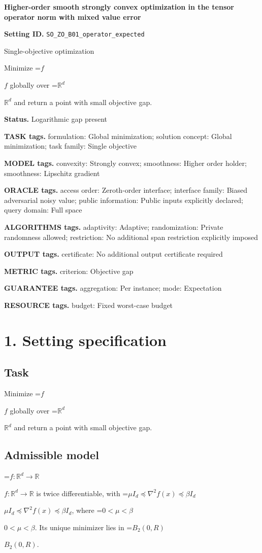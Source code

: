 \documentclass[10pt,a4paper]{article}
\newcommand{\AtlasMath}[1]{\par\begingroup\centering\setbox0=\hbox{$\displaystyle #1$}\ifdim\wd0>1.4\linewidth\typeout{ATLAS WIDE FORMULA: \the\wd0}\fi\ifdim\wd0>\linewidth\resizebox{\linewidth}{!}{\box0}\else\box0\fi\par\endgroup}
\newcommand{\AtlasInlineMath}[1]{\begingroup\setbox0=\hbox{$#1$}\ifdim\wd0>.4\linewidth\endgroup\AtlasMath{#1}\else\endgroup$#1$\fi}
\begin{document}
\raggedright

{\LARGE\bfseries\sffamily\color{AtlasNavy} Higher-order smooth strongly convex optimization in the tensor operator norm with mixed value error\par}\vspace{5pt}
\textbf{Setting ID.} \texttt{SO\_\allowbreak{}ZO\_\allowbreak{}B01\_\allowbreak{}operator\_\allowbreak{}expected}

Single-objective optimization

Minimize \AtlasInlineMath{f} globally over \AtlasInlineMath{\mathbb{R}^d} and return a point with small objective gap.

\textbf{Status.} Logarithmic gap present

\textbf{TASK tags.} formulation: Global minimization; solution concept: Global minimization; task family: Single objective

\textbf{MODEL tags.} convexity: Strongly convex; smoothness: Higher order holder; smoothness: Lipschitz gradient

\textbf{ORACLE tags.} access order: Zeroth-order interface; interface family: Biased adversarial noisy value; public information: Public inputs explicitly declared; query domain: Full space

\textbf{ALGORITHMS tags.} adaptivity: Adaptive; randomization: Private randomness allowed; restriction: No additional span restriction explicitly imposed

\textbf{OUTPUT tags.} certificate: No additional output certificate required

\textbf{METRIC tags.} criterion: Objective gap

\textbf{GUARANTEE tags.} aggregation: Per instance; mode: Expectation

\textbf{RESOURCE tags.} budget: Fixed worst-case budget

\section{1. Setting specification}
\subsection{Task}
Minimize \AtlasInlineMath{f} globally over \AtlasInlineMath{\mathbb{R}^d} and return a point with small objective gap.

\subsection{Admissible model}
\AtlasInlineMath{f:\mathbb{R}^d\to\mathbb{R}} is twice differentiable, with \AtlasInlineMath{\mu I_d\preceq\nabla^2f(x)\preceq\beta I_d}, where \AtlasInlineMath{0<\mu<\beta}. Its unique minimizer lies in \AtlasInlineMath{B_2(0,R)}.
\end{document}

